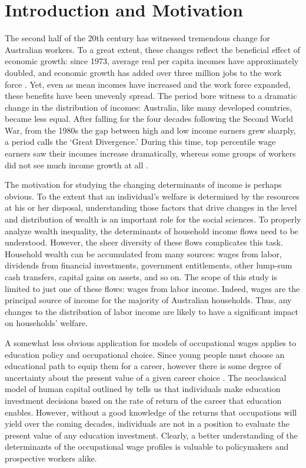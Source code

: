 \chapter{Introduction and Motivation}

The second half of the 20th century has witnessed tremendous change for Australian workers. To a great extent, these changes reflect the beneficial effect of economic growth: since 1973, average real per capita incomes have approximately doubled, and economic growth has added over three million jobs to the work force \citep{ABS5206,LFSApr2013}. Yet, even as mean incomes have increased and the work force expanded, these benefits have been unevenly spread. The period bore witness to a dramatic change in the distribution of incomes: Australia, like many developed countries, became less equal. After falling for the four decades following the Second World War, from the 1980s the gap between high and low income earners grew sharply, a period \citet{Leigh2013} calls the `Great Divergence.' During this time, top percentile wage earners saw their incomes increase dramatically, whereas some groups of workers did not see much income growth at all \citep{Atkinson1997,Borland1999,Leigh2013}.

The motivation for studying the changing determinants of income is perhaps obvious. To the extent that an individual's welfare is determined by the resources at his or her disposal, understanding those factors that drive changes in the level and distribution of wealth is an important role for the social sciences. To properly analyze wealth inequality, the determinants of household income flows need to be understood. However, the sheer diversity of these flows complicates this task. Household wealth can be accumulated from many sources: wages from labor, dividends from financial investments, government entitlements, other lump-sum cash transfers, capital gains on assets, and so on. The scope of this study is limited to just one of these flows: wages from labor income. Indeed, wages are the principal source of income for the majority of Australian households. Thus, any changes to the distribution of labor income are likely to have a significant impact on households' welfare. 

A somewhat less obvious application for models of occupational wages applies to education policy and occupational choice. Since young people must choose an educational path to equip them for a career, however there is some degree of uncertainty about the present value of a given career choice \citep[see e.g.][ch. 12]{Dixit1994}. The neoclassical model of human capital outlined by \citet{Becker2009} tells us that individuals make education investment decisions based on the rate of return of the career that education enables. However, without a good knowledge of the returns that occupations will yield over the coming decades, individuals are not in a position to evaluate the present value of any education investment. Clearly, a better understanding of the determinants of the occupational wage profiles is valuable to policymakers and prospective workers alike.

